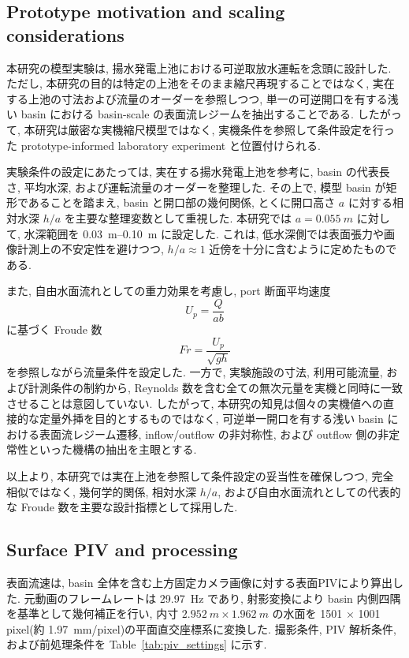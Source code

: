 \subsection{Prototype motivation and scaling considerations}
\label{sec:methods_scaling}

本研究の模型実験は, 揚水発電上池における可逆取放水運転を念頭に設計した. ただし, 本研究の目的は特定の上池をそのまま縮尺再現することではなく, 実在する上池の寸法および流量のオーダーを参照しつつ, 単一の可逆開口を有する浅い basin における basin-scale の表面流レジームを抽出することである. したがって, 本研究は厳密な実機縮尺模型ではなく, 実機条件を参照して条件設定を行った prototype-informed laboratory experiment と位置付けられる.

実験条件の設定にあたっては, 実在する揚水発電上池を参考に, basin の代表長さ, 平均水深, および運転流量のオーダーを整理した. その上で, 模型 basin が矩形であることを踏まえ, basin と開口部の幾何関係, とくに開口高さ $a$ に対する相対水深 $h/a$ を主要な整理変数として重視した. 本研究では $a=\SI{0.055}{m}$ に対して, 水深範囲を \SIrange{0.03}{0.10}{m} に設定した. これは, 低水深側では表面張力や画像計測上の不安定性を避けつつ, $h/a \approx 1$ 近傍を十分に含むように定めたものである.

また, 自由水面流れとしての重力効果を考慮し, port 断面平均速度
\begin{equation}
U_p=\frac{Q}{ab}
\label{eq:Up}
\end{equation}
に基づく Froude 数
\begin{equation}
Fr=\frac{U_p}{\sqrt{gh}}
\label{eq:Fr}
\end{equation}
を参照しながら流量条件を設定した. 一方で, 実験施設の寸法, 利用可能流量, および計測条件の制約から, Reynolds 数を含む全ての無次元量を実機と同時に一致させることは意図していない. したがって, 本研究の知見は個々の実機値への直接的な定量外挿を目的とするものではなく, 可逆単一開口を有する浅い basin における表面流レジーム遷移, inflow/outflow の非対称性, および outflow 側の非定常性といった機構の抽出を主眼とする.

以上より, 本研究では実在上池を参照して条件設定の妥当性を確保しつつ, 完全相似ではなく, 幾何学的関係, 相対水深 $h/a$, および自由水面流れとしての代表的な Froude 数を主要な設計指標として採用した.

\subsection{Surface PIV and processing}
\label{sec:methods_piv}

表面流速は, basin 全体を含む上方固定カメラ画像に対する表面PIVにより算出した. 元動画のフレームレートは \SI{29.97}{Hz} であり, 射影変換により basin 内側四隅を基準として幾何補正を行い, 内寸 $\SI{2.952}{m} \times \SI{1.962}{m}$ の水面を 1501 $\times$ 1001 pixel(約 \SI{1.97}{mm/pixel})の平面直交座標系に変換した. 撮影条件, PIV 解析条件, および前処理条件を Table~\ref{tab:piv_settings} に示す.

